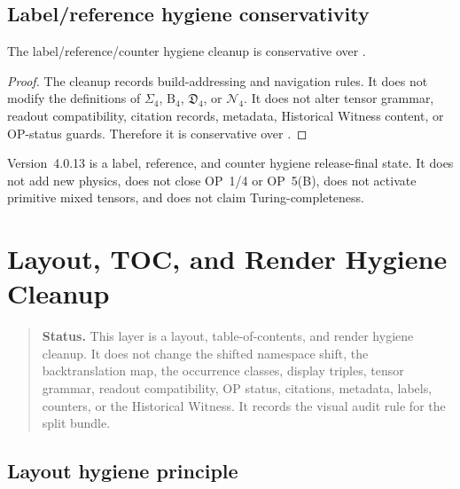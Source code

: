 \subsection{Label/reference hygiene conservativity}
\label{subsec:v4011-label-reference-hygiene-conservativity}

\begin{theorem}
\label{thm:v4011-label-reference-counter-hygiene-conservativity}
The  label/reference/counter hygiene cleanup is conservative over
.
\end{theorem}

\begin{proof}
The cleanup records build-addressing and navigation rules. It does not modify
the definitions of $\Sigma_4$, $\mathrm B_4$, $\mathfrak D_4$, or
$\mathcal N_4$. It does not alter tensor grammar, readout compatibility,
citation records, metadata, Historical Witness content, or OP-status guards.
Therefore it is conservative over .
\end{proof}

\begin{remark}
\label{rem:v4011-non-claim}
Version~4.0.13 is a label, reference, and counter hygiene release-final state. It does
not add new physics, does not close OP~1/4 or OP~5(B), does not activate
primitive mixed tensors, and does not claim Turing-completeness.
\end{remark}



\clearpage
\section{ Layout, TOC, and Render Hygiene Cleanup}
\label{sec:v4012-layout-toc-render-hygiene-cleanup}

\begin{quote}\small
\noindent\textbf{Status.}
This  layer is a layout, table-of-contents, and render hygiene cleanup.
It does not change the shifted namespace shift, the backtranslation map, the
occurrence classes, display triples, tensor grammar, readout compatibility, OP
status, citations, metadata, labels, counters, or the Historical Witness. It
records the visual audit rule for the split bundle.
\end{quote}

\subsection{Layout hygiene principle}
\label{subsec:v4012-layout-hygiene-principle}


